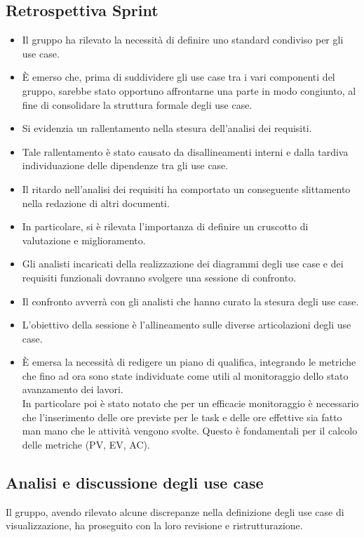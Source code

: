 \documentclass[a4paper,12pt]{article}
\begin{document}
\subsection{Retrospettiva Sprint}
\begin{itemize}
    \item Il gruppo ha rilevato la necessità di definire uno standard condiviso per gli use case.
    \item È emerso che, prima di suddividere gli use case tra i vari componenti del gruppo, sarebbe stato opportuno affrontarne una parte in modo congiunto, al fine di consolidare la struttura formale degli use case.
    \item Si evidenzia un rallentamento nella stesura dell'analisi dei requisiti.
    \item Tale rallentamento è stato causato da disallineamenti interni e dalla tardiva individuazione delle dipendenze tra gli use case.
    \item Il ritardo nell'analisi dei requisiti ha comportato un conseguente slittamento nella redazione di altri documenti.
    \item In particolare, si è rilevata l'importanza di definire un cruscotto di valutazione e miglioramento.
    \item Gli analisti incaricati della realizzazione dei diagrammi degli use case e dei requisiti funzionali dovranno svolgere una sessione di confronto.
    \item Il confronto avverrà con gli analisti che hanno curato la stesura degli use case.
    \item L'obiettivo della sessione è l'allineamento sulle diverse articolazioni degli use case.
    \item È emersa la necessità di redigere un piano di qualifica, integrando le metriche che fino ad ora sono state individuate come utili al monitoraggio dello stato avanzamento dei lavori.\\
    In particolare poi è stato notato che per un efficacie monitoraggio è necessario che l'inserimento delle ore previste per le task e delle ore effettive sia fatto man mano che le attività vengono svolte. Questo è fondamentali per il calcolo delle metriche (PV, EV, AC).
\end{itemize}

\subsection{Analisi e discussione degli use case}
Il gruppo, avendo rilevato alcune discrepanze nella definizione degli use case di visualizzazione, ha proseguito con la loro revisione e ristrutturazione.
\end{document}
